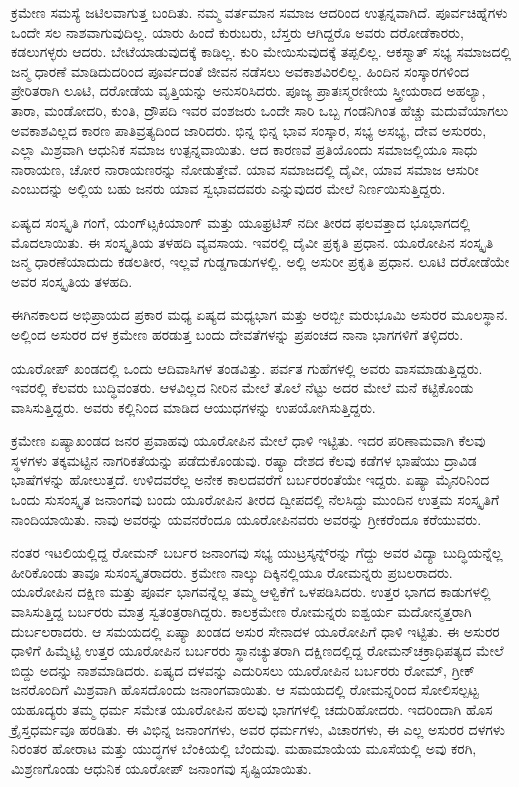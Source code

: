 ಕ್ರಮೇಣ ಸಮಸ್ಯೆ ಜಟಿಲವಾಗುತ್ತ ಬಂದಿತು. ನಮ್ಮ ವರ್ತಮಾನ ಸಮಾಜ ಆದರಿಂದ ಉತ್ಪನ್ನವಾಗಿದೆ. ಪೂರ್ವಚಿಹ್ನೆಗಳು ಒಂದೇ ಸಲ ನಾಶವಾಗುವುದಿಲ್ಲ. ಯಾರು ಹಿಂದೆ ಕುರುಬರು, ಬೆಸ್ತರು ಆಗಿದ್ದರೊ ಅವರು ದರೋಡೆಕಾರರು, ಕಡಲುಗಳ್ಳರು ಆದರು. ಬೇಟೆಯಾಡುವುದಕ್ಕೆ ಕಾಡಿಲ್ಲ. ಕುರಿ ಮೇಯಿಸುವುದಕ್ಕೆ ತಪ್ಪಲಿಲ್ಲ. ಆಕಸ್ಮಾತ್​ ಸಭ್ಯ ಸಮಾಜದಲ್ಲಿ ಜನ್ಮ ಧಾರಣೆ ಮಾಡಿದುದರಿಂದ ಪೂರ್ವದಂತೆ ಜೀವನ ನಡೆಸಲು ಅವಕಾಶವಿರಲಿಲ್ಲ. ಹಿಂದಿನ ಸಂಸ್ಕಾರಗಳಿಂದ ಪ್ರೇರಿತರಾಗಿ ಲೂಟಿ, ದರೋಡೆಯ ವೃತ್ತಿಯನ್ನು ಅನುಸರಿಸಿದರು. ಪೂಜ್ಯ ಪ್ರಾತಃಸ್ಮರಣೀಯ ಸ್ತ್ರೀಯರಾದ ಅಹಲ್ಯಾ, ತಾರಾ, ಮಂಡೋದರಿ, ಕುಂತಿ, ದ್ರೌಪದಿ ಇವರ ವಂಶಜರು ಒಂದೇ ಸಾರಿ ಒಬ್ಬ ಗಂಡನಿಗಿಂತ ಹೆಚ್ಚು ಮದುವೆಯಾಗಲು ಅವಕಾಶವಿಲ್ಲದ ಕಾರಣ ಪಾತಿವ್ರತ್ಯದಿಂದ ಜಾರಿದರು. ಭಿನ್ನ ಭಿನ್ನ ಭಾವ ಸಂಸ್ಕಾರ, ಸಭ್ಯ ಅಸಭ್ಯ, ದೇವ ಅಸುರರು, ಎಲ್ಲಾ ಮಿಶ್ರವಾಗಿ ಆಧುನಿಕ ಸಮಾಜ ಉತ್ಪನ್ನವಾಯಿತು. ಆದ ಕಾರಣವೆ ಪ್ರತಿಯೊಂದು ಸಮಾಜಲ್ಲಿಯೂ ಸಾಧು ನಾರಾಯಣ, ಚೋರ ನಾರಾಯಣರನ್ನು ನೋಡುತ್ತೇವೆ. ಯಾವ ಸಮಾಜದಲ್ಲಿ ದೈವೀ, ಯಾವ ಸಮಾಜ ಆಸುರೀ ಎಂಬುದನ್ನು ಅಲ್ಲಿಯ ಬಹು ಜನರು ಯಾವ ಸ್ವಭಾವದವರು ಎನ್ನುವುದರ ಮೇಲೆ ನಿರ್ಣಯಿಸುತ್ತಿದ್ದರು.

\vskip 3pt

ಏಷ್ಯದ ಸಂಸ್ಕೃತಿ ಗಂಗೆ, ಯಂಗ್​ಟ್ಸಕಿಯಾಂಗ್​ ಮತ್ತು ಯೂಫ್ರಟಿಸ್​ ನದೀ ತೀರದ ಫಲವತ್ತಾದ ಭೂಭಾಗದಲ್ಲಿ ಮೊದಲಾಯಿತು. ಈ ಸಂಸ್ಕೃತಿಯ ತಳಹದಿ ವ್ಯವಸಾಯ. ಇವರಲ್ಲಿ ದೈವೀ ಪ್ರಕೃತಿ ಪ್ರಧಾನ. ಯೂರೋಪಿನ ಸಂಸ್ಕೃತಿ ಜನ್ಮ ಧಾರಣೆಯಾದುದು ಕಡಲತೀರ, ಇಲ್ಲವೆ ಗುಡ್ಡಗಾಡುಗಳಲ್ಲಿ. ಅಲ್ಲಿ ಅಸುರೀ ಪ್ರಕೃತಿ ಪ್ರಧಾನ. ಲೂಟಿ ದರೋಡೆಯೇ ಅವರ ಸಂಸ್ಕೃತಿಯ ತಳಹದಿ.

\vskip 3pt

ಈಗಿನಕಾಲದ ಅಭಿಪ್ರಾಯದ ಪ್ರಕಾರ ಮಧ್ಯ ಏಷ್ಯದ ಮಧ್ಯಭಾಗ ಮತ್ತು ಅರಬ್ಬೀ ಮರುಭೂಮಿ ಅಸುರರ ಮೂಲಸ್ಥಾನ. ಅಲ್ಲಿಂದ ಅಸುರರ ದಳ ಕ್ರಮೇಣ ಹರಡುತ್ತ ಬಂದು ದೇವತೆಗಳನ್ನು ಪ್ರಪಂಚದ ನಾನಾ ಭಾಗಗಳಿಗೆ ತಳ್ಳಿದರು.

\vskip 3pt

ಯೂರೋಪ್​ ಖಂಡದಲ್ಲಿ ಒಂದು ಆದಿವಾಸಿಗಳ ತಂಡವಿತ್ತು. ಪರ್ವತ ಗುಹೆಗಳಲ್ಲಿ ಅವರು ವಾಸಮಾಡುತ್ತಿದ್ದರು. ಇವರಲ್ಲಿ ಕೆಲವರು ಬುದ್ಧಿವಂತರು. ಆಳವಿಲ್ಲದ ನೀರಿನ ಮೇಲೆ ತೊಲೆ ನೆಟ್ಟು ಅದರ ಮೇಲೆ ಮನೆ ಕಟ್ಟಿಕೊಂಡು ವಾಸಿಸುತ್ತಿದ್ದರು. ಅವರು ಕಲ್ಲಿನಿಂದ ಮಾಡಿದ ಆಯುಧಗಳನ್ನು ಉಪಯೋಗಿಸುತ್ತಿದ್ದರು.

\vskip 3pt

ಕ್ರಮೇಣ ಏಷ್ಯಾಖಂಡದ ಜನರ ಪ್ರವಾಹವು ಯೂರೋಪಿನ ಮೇಲೆ ಧಾಳಿ ಇಟ್ಟಿತು. ಇದರ ಪರಿಣಾಮವಾಗಿ ಕೆಲವು ಸ್ಥಳಗಳು ತಕ್ಕಮಟ್ಟಿನ ನಾಗರಿಕತೆಯನ್ನು ಪಡೆದುಕೊಂಡುವು. ರಷ್ಯಾ ದೇಶದ ಕೆಲವು ಕಡೆಗಳ ಭಾಷೆಯು ದ್ರಾವಿಡ ಭಾಷೆಗಳನ್ನು ಹೋಲುತ್ತದೆ. ಉಳಿದವರೆಲ್ಲ ಅನೇಕ ಕಾಲದವರೆಗೆ ಬರ್ಬರರಂತೆಯೇ ಇದ್ದರು. ಏಷ್ಯಾ ಮೈನರಿನಿಂದ ಒಂದು ಸುಸಂಸ್ಕೃತ ಜನಾಂಗವು ಬಂದು ಯೂರೋಪಿನ ತೀರದ ದ್ವೀಪದಲ್ಲಿ ನೆಲಸಿದ್ದು ಮುಂದಿನ ಉತ್ತಮ ಸಂಸ್ಕೃತಿಗೆ ನಾಂದಿಯಾಯಿತು. ನಾವು ಅವರನ್ನು ಯವನರೆಂದೂ ಯೂರೋಪಿನವರು ಅವರನ್ನು ಗ್ರೀಕರೆಂದೂ ಕರೆಯುವರು.

\vskip 3pt

ನಂತರ ಇಟಲಿಯಲ್ಲಿದ್ದ ರೋಮನ್​ ಬರ್ಬರ ಜನಾಂಗವು ಸಭ್ಯ ಯುಟ್ರಸ್ಕನ್ನ್​ರನ್ನು ಗೆದ್ದು ಅವರ ವಿದ್ಯಾ ಬುದ್ಧಿಯನ್ನೆಲ್ಲ ಹೀರಿಕೊಂಡು ತಾವೂ ಸುಸಂಸ್ಕೃತರಾದರು. ಕ್ರಮೇಣ ನಾಲ್ಕು ದಿಕ್ಕಿನಲ್ಲಿಯೂ ರೋಮನ್ನರು ಪ್ರಬಲರಾದರು. ಯೂರೋಪಿನ ದಕ್ಷಿಣ ಮತ್ತು ಪೂರ್ವ ಭಾಗವನ್ನೆಲ್ಲ ತಮ್ಮ ಆಳ್ವಿಕೆಗೆ ಒಳಪಡಿಸಿದರು. ಉತ್ತರ ಭಾಗದ ಕಾಡುಗಳಲ್ಲಿ ವಾಸಿಸುತ್ತಿದ್ದ ಬರ್ಬರರು ಮಾತ್ರ ಸ್ವತಂತ್ರರಾಗಿದ್ದರು. ಕಾಲಕ್ರಮೇಣ ರೋಮನ್ನರು ಐಶ್ವರ್ಯ ಮದೋನ್ಮತ್ತರಾಗಿ ದುರ್ಬಲರಾದರು. ಆ ಸಮಯದಲ್ಲಿ ಏಷ್ಯಾ ಖಂಡದ ಅಸುರ ಸೇನಾದಳ ಯೂರೋಪಿಗೆ ಧಾಳಿ ಇಟ್ಟಿತು. ಈ ಅಸುರರ ಧಾಳಿಗೆ ಹಿಮ್ಮೆಟ್ಟಿ ಉತ್ತರ ಯೂರೋಪಿನ ಬರ್ಬರರು ಸ್ಥಾನಚ್ಯುತರಾಗಿ ದಕ್ಷಿಣದಲ್ಲಿದ್ದ ರೋಮನ್​ ಚಕ್ರಾಧಿಪತ್ಯದ ಮೇಲೆ ಬಿದ್ದು ಅದನ್ನು ನಾಶಮಾಡಿದರು. ಏಷ್ಯದ ದಳವನ್ನು ಎದುರಿಸಲು ಯೂರೋಪಿನ ಬರ್ಬರರು ರೋಮ್​, ಗ್ರೀಕ್​ ಜನರೊಂದಿಗೆ ಮಿಶ್ರವಾಗಿ ಹೊಸದೊಂದು ಜನಾಂಗ\break ವಾಯಿತು. ಆ ಸಮಯದಲ್ಲಿ ರೋಮನ್ನರಿಂದ ಸೋಲಿಸಲ್ಪಟ್ಟ ಯಹೂದ್ಯರು ತಮ್ಮ ಧರ್ಮ ಸಮೇತ ಯೂರೋಪಿನ ಹಲವು ಭಾಗಗಳಲ್ಲಿ ಚದುರಿಹೋದರು. ಇದರಿಂದಾಗಿ ಹೊಸ ಕ್ರೈಸ್ತಧರ್ಮವೂ ಹರಡಿತು. ಈ ವಿಭಿನ್ನ ಜನಾಂಗಗಳು, ಅವರ ಧರ್ಮಗಳು, ವಿಚಾರಗಳು, ಈ ಎಲ್ಲ ಅಸುರರ ದಳಗಳು ನಿರಂತರ ಹೋರಾಟ ಮತ್ತು ಯುದ್ಧಗಳ ಬೆಂಕಿಯಲ್ಲಿ ಬೆಂದುವು. ಮಹಾಮಾಯೆಯ ಮೂಸೆಯಲ್ಲಿ ಅವು ಕರಗಿ, ಮಿಶ್ರಣಗೊಂಡು ಆಧುನಿಕ ಯೂರೋಪ್​ ಜನಾಂಗವು ಸೃಷ್ಟಿಯಾಯಿತು.

